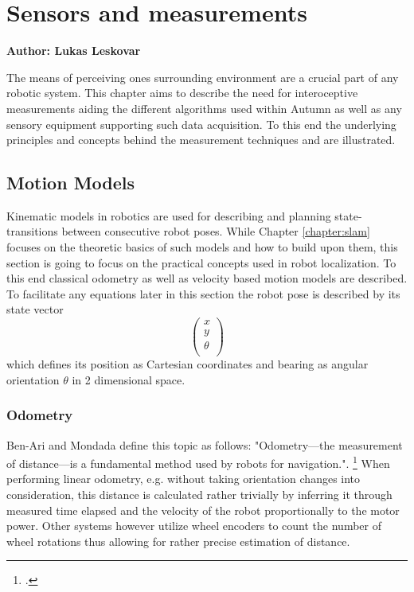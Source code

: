 \chapter{Sensors and measurements}

\textbf{Author: Lukas Leskovar} 

The means of perceiving ones surrounding environment are a crucial part of any robotic system. This chapter aims to describe the need for interoceptive measurements aiding the different algorithms used within Autumn as well as any sensory equipment supporting such data acquisition. To this end the underlying principles and concepts behind the measurement techniques and  are illustrated.

\section{Motion Models}
Kinematic models in robotics are used for describing and planning state-transitions between consecutive robot poses. While Chapter \ref{chapter:slam} focuses on the theoretic basics of such models and how to build upon them, this section is going to focus on the practical concepts used in robot localization. To this end classical odometry as well as velocity based motion models are described.
To facilitate any equations later in this section the robot pose is described by its state vector 
\[
\begin{pmatrix}
	x \\
	y \\
	\theta \\
\end{pmatrix}
\] 
which defines its position as Cartesian coordinates and bearing as angular orientation $\theta$ in 2 dimensional space. 

\subsection{Odometry}
Ben-Ari and Mondada define this topic as follows: "Odometry—the measurement of distance—is a fundamental method used by robots for navigation.". \footcite{ben2017elements} 
When performing linear odometry, e.g. without taking orientation changes into consideration, this distance is calculated rather trivially by inferring it through measured time elapsed and the velocity of the robot proportionally to the motor power. 
Other systems however utilize wheel encoders to count the number of wheel rotations thus allowing for rather precise estimation of distance. 


